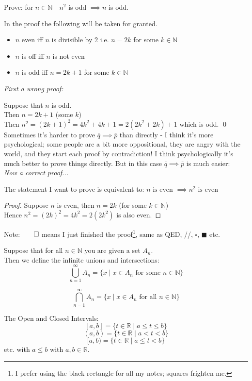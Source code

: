 \documentclass[twoside]{scrartcl}
\begin{document}
\begin{example} Prove: for $n \in \mathbb{N} \quad n^2$ is odd $\implies n$ is odd.

In the proof the following will be taken for granted.
\begin{itemize}
\item $n$ even iff $n$ is divisible by 2 i.e. $n = 2k$ for some $k \in \mathbb{N}$
\item $n$ is off iff $n$ is not even
\item $n$ is odd iff $n = 2k+1$ for some $k \in \mathbb{N}$
\end{itemize}\vspace*{10pt}

\emph{First a wrong proof:}

Suppose that $n$ is odd. \\
Then $n = 2k +1$ (some $k$)\\
Then $n^2 = (2k+1)^2 = 4k^2 + 4k+1 = 2(2k^2 + 2k) + 1$ which is odd. \qed\\

Sometimes it's harder to prove $\bar{q} \implies \bar{p}$ than directly - I think it's more psychological; some people are a bit more oppositional, they are angry with the world, and they start each proof by contradiction! I think psychologically it's much better to prove things directly. But in this case $\bar{q} \implies \bar{p}$ is much easier:\\

\emph{Now a correct proof...}

The statement I want to prove is equivalent to:
$n \text{ is even } \implies n^2 \text{ is even }$

\begin{proof}Suppose $n$ is even, then $n = 2k$ (for some $k \in \mathbb{N}$)\\
Hence $n^2 = (2k)^2 = 4k^2 = 2(2k^2)$ is also even.
\end{proof}
\end{example}\vspace*{5pt}

Note:$\qed$ means I just finished the proof\footnote{I prefer using the black rectangle for all my notes; squares frighten me.}, same as QED, //, $\square$, $\blacksquare$ etc.\\

\begin{definition}
Suppose that for all $n \in \mathbb{N}$ you are given a set $A_n$.\\

Then we define the infinite unions and intersections:\\
\[\bigcup_{n=1}^{\infty}A_{n} = \{ x \;|\; x \in A_n \text{ for some } n \in \mathbb{N}\}\]

\[\bigcap_{n=1}^{\infty}A_{n} = \{ x \;|\; x \in A_n \text{ for all } n \in \mathbb{N}\}\]

The Open and Closed Intervals:
\[[a,b] = \{t \in \mathbb{R} \;|\; a \leq t \leq b\}\]
\[(a,b) = \{t \in \mathbb{R} \;|\; a < t < b\}\]
\[[a,b) = \{t \in \mathbb{R} \;|\; a \leq t < b\}\]
 etc. with $a \leq b$ with $a,b \in \mathbb{R}$.
\end{definition}
\end{document}
